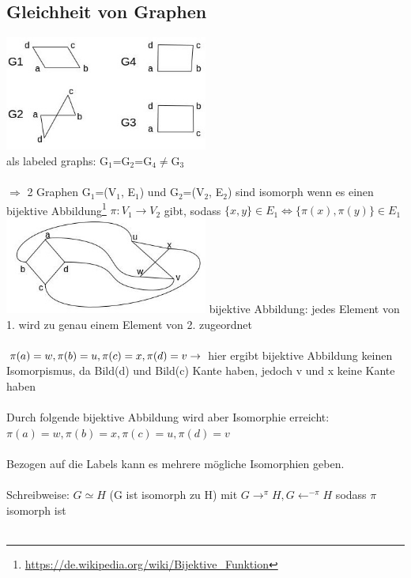 \subsection{Gleichheit von Graphen}
\includegraphics[width=0.5\textwidth]{lectures/161014/pix/5.jpg}\\
als labeled graphs: G$_1$=G$_2$=G$_4\neq$G$_3$\\\\
$\Rightarrow$ 2 Graphen G$_1$=(V$_1$, E$_1$) und G$_2$=(V$_2$, E$_2$) sind isomorph wenn es einen bijektive Abbildung\footnote{\url{https://de.wikipedia.org/wiki/Bijektive_Funktion}} $\pi:V_1 \rightarrow V_2$ gibt, sodass $\{x,y\} \in E_1 \Leftrightarrow \{\pi(x),\pi(y)\} \in E_1$
\\
\includegraphics[width=0.5\textwidth]{lectures/161014/pix/6.jpg}
bijektive Abbildung: jedes Element von 1. wird zu genau einem Element von 2. zugeordnet\\\\
$\pi(a)=w, \pi(b)=u, \pi(c)=x, \pi(d)=v \\ \rightarrow$ hier ergibt bijektive Abbildung keinen Isomorpismus, da Bild(d) und Bild(c) Kante haben, jedoch v und x keine Kante haben\\\\
Durch folgende bijektive Abbildung wird aber Isomorphie erreicht:\\
$\pi(a)=w, \pi(b)=x, \pi(c)=u, \pi(d)=v$
\\\\
Bezogen auf die Labels kann es mehrere mögliche Isomorphien geben.
\\\\
Schreibweise: $G \simeq H$ (G ist isomorph zu H) mit 
$G\rightarrow^\pi H, G \leftarrow^{-\pi}H$ sodass $\pi$ isomorph ist
\\\\
